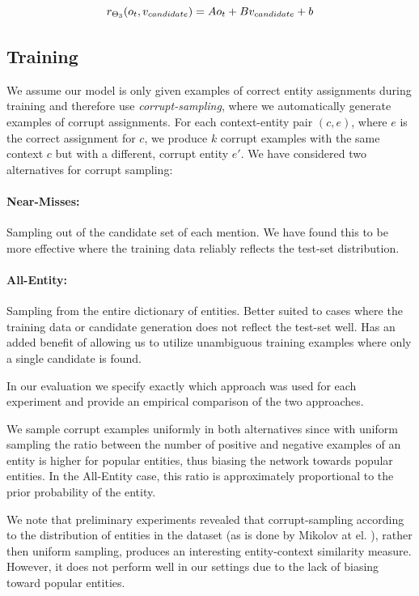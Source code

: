 \documentclass[11pt]{article}
\begin{document}
	\begin{equation}
	\label{eq3}
	r_{\Theta_3}(o_t, v_{candidate}) = Ao_t + Bv_{candidate} + b \\
	\end{equation}
	
	\subsection{Training}
	
	We assume our model is only given examples of correct entity assignments during training and therefore use \textit{corrupt-sampling}, where we automatically generate examples of corrupt assignments. For each context-entity pair $(c,e)$, where $e$ is the correct assignment for $c$, we produce $k$ corrupt examples with the same context $c$ but with a different, corrupt entity $e'$. We have considered two alternatives for corrupt sampling:
	
	\paragraph{Near-Misses:} 
	Sampling out of the candidate set of each mention. We have found this to be more effective where the training data reliably reflects the test-set distribution.
	
	\paragraph{All-Entity:} 
	Sampling from the entire dictionary of entities. Better suited to cases where the training data or candidate generation does not reflect the test-set well. Has an added benefit of allowing us to utilize unambiguous training examples where only a single candidate is found.
	
	In our evaluation we specify exactly which approach was used for each experiment and provide an empirical comparison of the two approaches.
	
	We sample corrupt examples uniformly in both alternatives since with uniform sampling the ratio between the number of positive and negative examples of an entity is higher for popular entities, thus biasing the network towards popular entities. In the All-Entity case, this ratio is approximately proportional to the prior probability of the entity. 
	
	We note that preliminary experiments revealed that corrupt-sampling according to the distribution of entities in the dataset (as is done by Mikolov at el. ), rather then uniform sampling, produces an interesting entity-context similarity measure. However, it does not perform well in our settings due to the lack of biasing toward popular entities.
	
\end{document}
